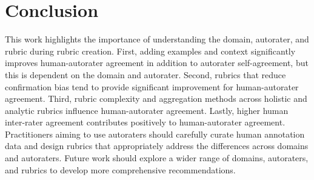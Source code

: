 \section{Conclusion}
This work highlights the importance of understanding the domain, autorater, and rubric during rubric creation. First, adding examples and context significantly improves human-autorater agreement in addition to autorater self-agreement, but this is dependent on the domain and autorater.
Second, rubrics that reduce confirmation bias tend to provide significant improvement for human-autorater agreement. 
Third, rubric complexity and aggregation methods across holistic and analytic rubrics influence human-autorater agreement.
Lastly, higher human inter-rater agreement contributes positively to human-autorater agreement. Practitioners aiming to use autoraters should carefully curate human annotation data and design rubrics that appropriately address the differences across domains and autoraters. Future work should explore a wider range of domains, autoraters, and rubrics to develop more comprehensive recommendations.

